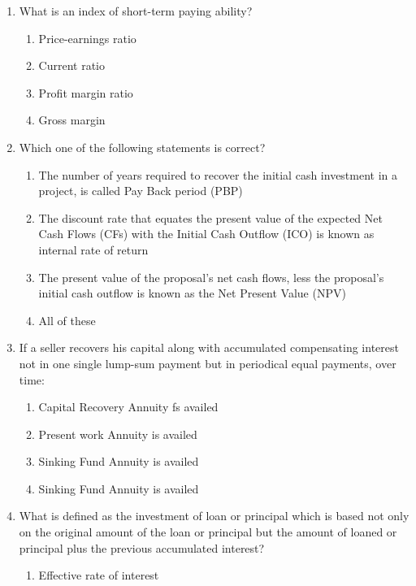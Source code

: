 \documentclass[11pt,a4paper]{article}
\begin{document}
\begin{enumerate}
\item{What is an index of short-term paying ability?}
\begin{enumerate}[label=\Alph*.]
\item{Price-earnings ratio}
\item{Current ratio}
\item{Profit margin ratio}
\item{Gross margin}
\end{enumerate}
\item{Which one of the following statements is correct?}
\begin{enumerate}[label=\Alph*.]
\item{The number of years required to recover the initial cash investment in a project, is called Pay Back period (PBP)}
\item{The discount rate that equates the present value of the expected Net Cash Flows (CFs) with the Initial Cash Outflow (ICO) is known as internal rate of return}
\item{The present value of the proposal's net cash flows, less the proposal's initial cash outflow is known as the Net Present Value (NPV)}
\item{All of these}
\end{enumerate}
\item{If a seller recovers his capital along with accumulated compensating interest not in one single lump-sum payment but in periodical equal payments, over time:}
\begin{enumerate}[label=\Alph*.]
\item{Capital Recovery Annuity fs availed}
\item{Present work Annuity is availed}
\item{Sinking Fund Annuity is availed}
\item{Sinking Fund Annuity is availed}
\end{enumerate}
\item{What is defined as the investment of loan or principal which is based not only on the original amount of the loan or principal but the amount of loaned or principal plus the previous accumulated interest?}
\begin{enumerate}[label=\Alph*.]
\item{Effective rate of interest}

\end{enumerate}
\end{enumerate}
\end{document}
